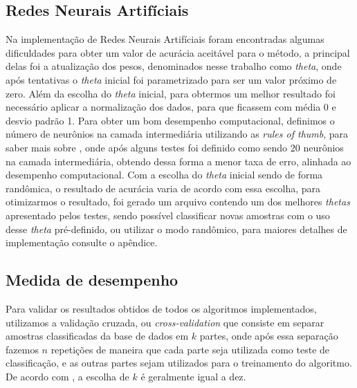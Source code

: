 \documentclass[10pt, conference, compsocconf]{IEEEtran}
\begin{document}
\subsection{Redes Neurais Artifíciais}
Na implementação de Redes Neurais Artifíciais foram encontradas algumas dificuldades para obter um valor de acurácia aceitável para o método, a principal delas foi a atualização dos pesos, denominados nesse trabalho como \textit{theta}, onde após tentativas o \textit{theta} inicial foi parametrizado para ser um valor próximo de zero. 
Além da escolha do \textit{theta} inicial, para obtermos um melhor resultado foi necessário aplicar a normalização dos dados, para que ficassem com média 0 e desvio padrão 1.
Para obter um bom desempenho computacional, definimos o número de neurônios na camada intermediária utilizando as \textit{rules of thumb}, para saber mais sobre \cite{12}, onde após alguns testes foi definido como sendo 20 neurônios na camada intermediária, obtendo dessa forma a menor taxa de erro, alinhada ao desempenho computacional.
Com a escolha do \textit{theta} inicial sendo de forma randômica, o resultado de acurácia varia de acordo com essa escolha, para otimizarmos o resultado, foi gerado um arquivo contendo um dos melhores \textit{thetas} apresentado pelos testes, sendo possível classificar novas amostras com o uso desse \textit{theta} pré-definido, ou utilizar o modo randômico, para maiores detalhes de implementação consulte o apêndice.
\subsection{Medida de desempenho}
Para validar os resultados obtidos de todos os algoritmos implementados, utilizamos a validação cruzada, ou \textit{cross-validation} que consiste em separar amostras classificadas da base de dados em $k$ partes, onde após essa separação fazemos $n$ repetições de maneira que cada parte seja utilizada como teste de classificação, e as outras partes sejam utilizados para o treinamento do algoritmo. De acordo com \cite{10}, a escolha de $k$ é geralmente igual a dez.
\end{document}

